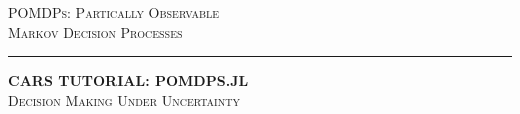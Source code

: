 
\begin{frame}[plain,c]{}

\begin{center}
\Large \textsc{POMDPs: Partically Observable\\Markov Decision Processes}
\textcolor[RGB]{100,100,100}{\rule{\linewidth}{0.2pt}}

{\color{cardinal}\textbf{\Large{CARS} \Large{T}\normalsize{UTORIAL}: \Large{POMDP}\normalsize{S.JL}}}\\
{\normalsize\textsc{Decision Making Under Uncertainty}}

\end{center}

\end{frame}


